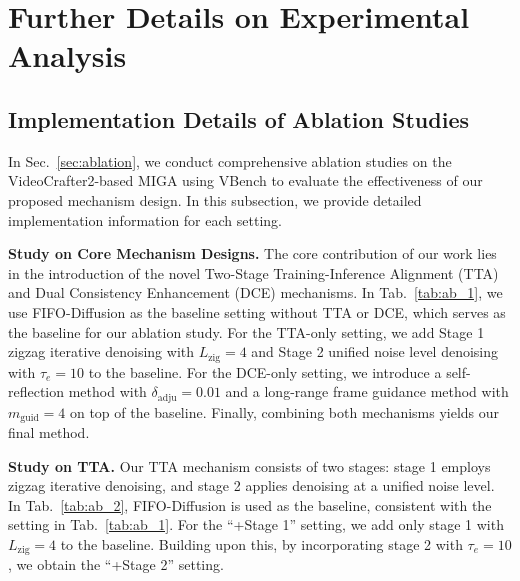 \documentclass{article}
\theoremstyle{plain}
\theoremstyle{definition}
\theoremstyle{remark}
\begin{document}
\section{Further Details on Experimental Analysis}
\subsection{Implementation Details of Ablation Studies}
\label{app:ab_exp_imp}
In Sec.~\ref{sec:ablation}, we conduct comprehensive ablation studies on the VideoCrafter2-based MIGA using VBench to evaluate the effectiveness of our proposed mechanism design.
In this subsection, we provide detailed implementation information for each setting.

\textbf{Study on Core Mechanism Designs.}
The core contribution of our work lies in the introduction of the novel Two-Stage Training-Inference Alignment (TTA) and Dual Consistency Enhancement (DCE) mechanisms.
In Tab.~\ref{tab:ab_1}, we use FIFO-Diffusion as the baseline setting without TTA or DCE, which serves as the baseline for our ablation study.
For the TTA-only setting, we add Stage 1 zigzag iterative denoising with $L_{\mathrm{zig}}=4$ and Stage 2 unified noise level denoising with $\tau_e = 10$ to the baseline.
For the DCE-only setting, we introduce a self-reflection method with $\delta_{\mathrm{adju}}=0.01$ and a long-range frame guidance \cite{chen2025s2guidancestochasticselfguidance,feng2025atctrack} method with $m_{\mathrm{guid}}=4$ on top of the baseline.
Finally, combining both mechanisms yields our final method.


\textbf{Study on TTA.}
Our TTA mechanism consists of two stages: stage 1 employs zigzag iterative denoising, and stage 2 applies denoising at a unified noise level.
In Tab.~\ref{tab:ab_2}, FIFO-Diffusion is used as the baseline, consistent with the setting in Tab.~\ref{tab:ab_1}.
For the “+Stage 1” setting, we add only stage 1 with $L_{\mathrm{zig}}=4$ to the baseline.
Building upon this, by incorporating stage 2 with $\tau_e=10$, we obtain the “+Stage 2” setting.
\end{document}
